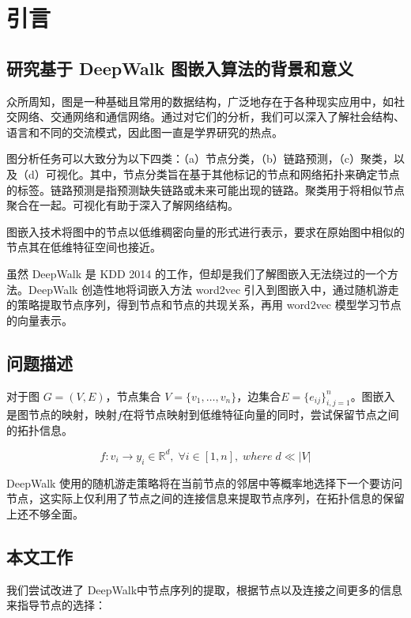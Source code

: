 \documentclass{ctexart}
\begin{document}


\tableofcontents
\newpage

\section{引言}

\subsection{研究基于 DeepWalk 图嵌入算法的背景和意义}

众所周知，图是一种基础且常用的数据结构，广泛地存在于各种现实应用中，如社交网络、交通网络和通信网络。通过对它们的分析，我们可以深入了解社会结构、语言和不同的交流模式，因此图一直是学界研究的热点。

图分析任务可以大致分为以下四类：（a）节点分类，（b）链路预测，（c）聚类，以及（d）可视化\cite{goyal2018graph}。其中，节点分类旨在基于其他标记的节点和网络拓扑来确定节点的标签。链路预测是指预测缺失链路或未来可能出现的链路。聚类用于将相似节点聚合在一起。可视化有助于深入了解网络结构。

图嵌入技术将图中的节点以低维稠密向量的形式进行表示，要求在原始图中相似的节点其在低维特征空间也接近。

虽然 DeepWalk 是 KDD 2014 的工作，但却是我们了解图嵌入无法绕过的一个方法。DeepWalk 创造性地将词嵌入方法 word2vec 引入到图嵌入中，通过随机游走的策略提取节点序列，得到节点和节点的共现关系，再用 word2vec 模型学习节点的向量表示。

\subsection{问题描述}

对于图 $G=(V,E)$，节点集合 $V=\{v_1,\dots,v_n\}$，边集合$ E=\{ e_{ij} \}_{i,j=1}^n $。图嵌入是图节点的映射，映射$f$在将节点映射到低维特征向量的同时，尝试保留节点之间的拓扑信息。

$$
f:v_i \to y_i \in \mathbb{R}^d, \;\forall i \in[1,n],\;where\; d \ll |V|
$$

DeepWalk 使用的随机游走策略将在当前节点的邻居中等概率地选择下一个要访问节点，这实际上仅利用了节点之间的连接信息来提取节点序列，在拓扑信息的保留上还不够全面。

\subsection{本文工作}

我们尝试改进了 DeepWalk中节点序列的提取，根据节点以及连接之间更多的信息来指导节点的选择：
\end{document}
